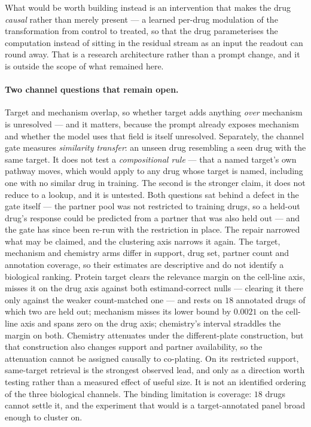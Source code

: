 What would be worth building instead is an intervention that makes the drug \emph{causal} rather than
merely present --- a learned per-drug modulation of the transformation from control to treated, so
that the drug parameterises the computation instead of sitting in the residual stream as an input the
readout can round away. That is a research architecture rather than a prompt change, and it is
outside the scope of what remained here.

\paragraph{Two channel questions that remain open.} Target and
mechanism overlap, so whether target adds anything \emph{over} mechanism is unresolved --- and it
matters, because the prompt already exposes mechanism and whether the model uses that field is itself
unresolved. Separately, the channel gate measures
\emph{similarity transfer}: an unseen drug resembling a seen drug with the same target. It does not
test a \emph{compositional rule} --- that a named target's own pathway moves, which would apply to
any drug whose target is named, including one with no similar drug in training. The second is the
stronger claim, it does not reduce to a lookup, and it is untested. Both questions sat behind a
defect in the gate itself --- the partner pool was not restricted to training drugs, so a held-out
drug's response could be predicted from a partner that was also held out --- and the gate has since
been re-run with the restriction in place. The repair narrowed what may be claimed, and the
clustering axis narrows it again. The target, mechanism and chemistry arms differ in support, drug
set, partner count and annotation coverage, so their estimates are descriptive and do not identify
a biological ranking. Protein target clears the relevance margin on the cell-line axis,
misses it on the drug axis against both estimand-correct nulls --- clearing it there only against
the weaker count-matched one --- and rests on $18$ annotated drugs of which two are held out;
mechanism misses its lower bound by
$0.0021$ on the cell-line axis and spans zero on the drug axis; chemistry's interval straddles the
margin on both. Chemistry attenuates under the different-plate construction, but that construction
also changes support and partner availability, so the attenuation cannot be assigned causally to
co-plating. On its restricted support, same-target retrieval is the strongest observed lead, and
only as a direction worth testing rather than a measured effect of useful size. It is not an
identified ordering of the three biological channels. The binding limitation is coverage: $18$
drugs cannot settle it, and the experiment that would is a target-annotated panel broad enough to
cluster on.

